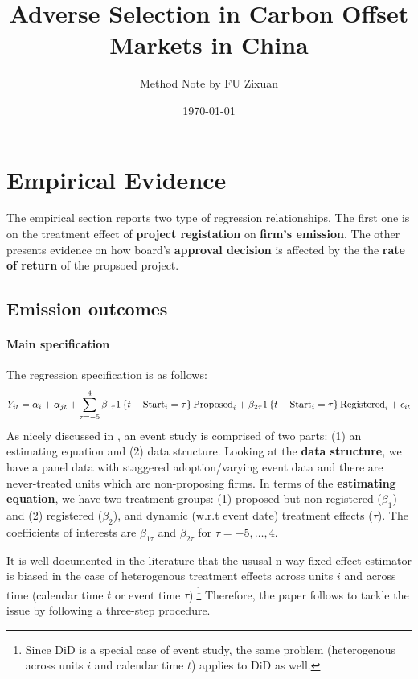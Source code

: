 \documentclass[12pt]{article}[margin=1in]
\title{\textbf{Adverse Selection in Carbon Offset Markets
in China}}
\author{Method Note by FU Zixuan}
\date{\today}
\begin{document}
\maketitle





\section{Empirical Evidence}
The empirical section reports two type of regression relationships. The first one is on the treatment effect of \textbf{project registation} on \textbf{firm's emission}. The other presents evidence on how board's \textbf{approval decision} is affected by the the \textbf{rate of return} of the propsoed project.
\subsection{Emission outcomes}
\paragraph{Main specification}
The regression specification is as follows:
\begin{equation}\label{eq:event_study}
    Y_{it} = \alpha_i+\alpha_{jt}+\sum_{\tau=-5}^4 \beta_{1\tau} 1\left\{t-\text{Start}_i=\tau\right\}\text{Proposed}_i+\beta_{2\tau} 1\left\{t-\text{Start}_i=\tau\right\}\text{Registered}_i+\epsilon_{it}
\end{equation}
As nicely discussed in \cite{borusyak2024revisiting}, an event study is comprised of two parts: (1) an estimating equation and (2) data structure.
Looking at the \textbf{data structure}, we have a panel data with staggered adoption/varying event data and there are never-treated units which are non-proposing firms. In terms of the \textbf{estimating equation}, we have two treatment groups: (1) proposed but non-registered ($\beta_{1}$) and (2) registered ($\beta_{2}$), and dynamic (w.r.t event date) treatment effects ($\tau$). The coefficients of interests are $\beta_{1\tau}$ and $\beta_{2\tau}$ for $\tau=-5,\ldots,4$.

It is well-documented in the literature that the ususal n-way fixed effect estimator is biased in the case of heterogenous treatment effects across units $i$ and across time (calendar time $t$ or event time $\tau$).\footnote{Since DiD is a special case of event study, the same problem (heterogenous across units $i$ and calendar time $t$) applies to DiD as well.} Therefore, the paper follows \citet{borusyak2024revisiting} to tackle the issue by following a three-step procedure.
\end{document}
